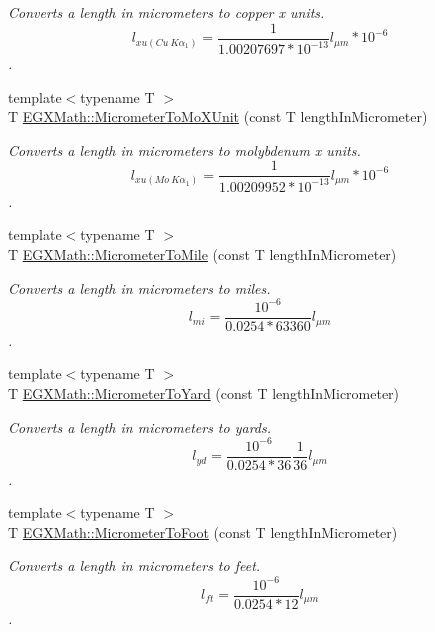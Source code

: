 \begin{DoxyCompactItemize}
\begin{DoxyCompactList}\small\item\em Converts a length in micrometers to copper x units. \[ l_{xu(Cu\ K\alpha_1)}= \frac{1}{1.00207697*10^{-13}} l_{\mu m} * 10^{-6}\]. \end{DoxyCompactList}\item 
{\footnotesize template$<$typename T $>$ }\\T \mbox{\hyperlink{group___e_g_x_math-_conversions-_length_conversions-_s_i-_micrometer-_non-_s_i_ga2ed475ce56e23d7783d6925f5b409f44}{E\+G\+X\+Math\+::\+Micrometer\+To\+Mo\+X\+Unit}} (const T length\+In\+Micrometer)
\begin{DoxyCompactList}\small\item\em Converts a length in micrometers to molybdenum x units. \[ l_{xu(Mo\ K\alpha_1)}=\frac{1}{1.00209952*10^{-13}} l_{\mu m} * 10^{-6}\]. \end{DoxyCompactList}\item 
{\footnotesize template$<$typename T $>$ }\\T \mbox{\hyperlink{group___e_g_x_math-_conversions-_length_conversions-_s_i-_micrometer-_imperial_ga0419c861d5edc78538ff023c12b9b6d9}{E\+G\+X\+Math\+::\+Micrometer\+To\+Mile}} (const T length\+In\+Micrometer)
\begin{DoxyCompactList}\small\item\em Converts a length in micrometers to miles. \[ l_{mi}=\frac{10^{-6}}{0.0254 * 63360} l_{\mu m} \]. \end{DoxyCompactList}\item 
{\footnotesize template$<$typename T $>$ }\\T \mbox{\hyperlink{group___e_g_x_math-_conversions-_length_conversions-_s_i-_micrometer-_imperial_ga3152a5a36ea33c2ab85fe275569f5ac0}{E\+G\+X\+Math\+::\+Micrometer\+To\+Yard}} (const T length\+In\+Micrometer)
\begin{DoxyCompactList}\small\item\em Converts a length in micrometers to yards. \[ l_{yd}= \frac{10^{-6}}{0.0254 * 36} \frac{1}{36} l_{\mu m} \]. \end{DoxyCompactList}\item 
{\footnotesize template$<$typename T $>$ }\\T \mbox{\hyperlink{group___e_g_x_math-_conversions-_length_conversions-_s_i-_micrometer-_imperial_gaed71a8fede89b4bc87d3967e4d99c30d}{E\+G\+X\+Math\+::\+Micrometer\+To\+Foot}} (const T length\+In\+Micrometer)
\begin{DoxyCompactList}\small\item\em Converts a length in micrometers to feet. \[ l_{ft}= \frac{10^{-6}}{0.0254 * 12} l_{\mu m} \]. \end{DoxyCompactList}\item 

\end{DoxyCompactItemize}
